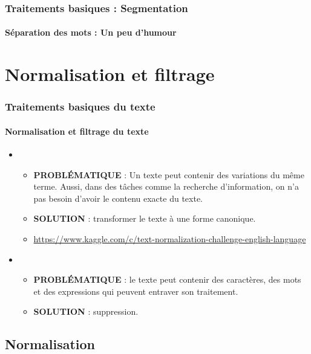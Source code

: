 \documentclass[xcolor=table]{beamer}
\begin{document}
\begin{frame}
\frametitle{Traitements basiques : Segmentation}
\framesubtitle{Séparation des mots : Un peu d'humour} 

\begin{center}
\end{center}

\end{frame}


\section{Normalisation et filtrage}

\begin{frame}
\frametitle{Traitements basiques du texte}
\framesubtitle{Normalisation et filtrage du texte}

\begin{itemize}
	\item {}
	\begin{itemize}
		\item \textbf{PROBLÉMATIQUE} : Un texte peut contenir des variations du même terme. 
		Aussi, dans des tâches comme la recherche d'information, on n'a pas besoin d'avoir le contenu exacte du texte.
		\item \textbf{SOLUTION} : transformer le texte à une forme canonique.
		\item \url{https://www.kaggle.com/c/text-normalization-challenge-english-language}
	\end{itemize}
	\item {}
	\begin{itemize}
		\item \textbf{PROBLÉMATIQUE} : le texte peut contenir des caractères, des mots et des expressions qui peuvent entraver son traitement.
		\item \textbf{SOLUTION} : suppression.
	\end{itemize}
\end{itemize}

\end{frame}

\subsection{Normalisation}
\end{document}
